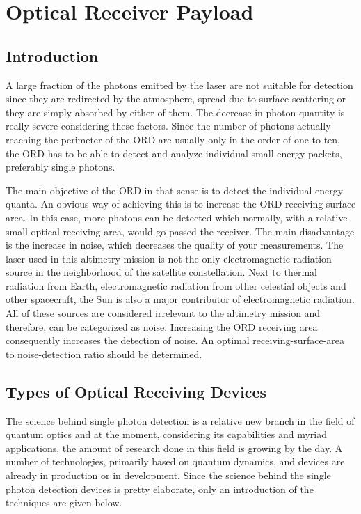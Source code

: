 \section{Optical Receiver Payload}
	\label{blDOreceiver}
		\subsection{Introduction}
A large fraction of the photons emitted by the \acs{laser} are not suitable for detection since they are redirected by the atmosphere, spread due to surface scattering or they are simply absorbed by either of them. The decrease in photon quantity is really severe considering these factors. Since the number of photons actually reaching the perimeter of the \ac{ORD} are usually only in the order of one to ten, the \acs{ORD} has to be able to detect and analyze individual small energy packets, preferably single photons. 

The main objective of the \acs{ORD} in that sense is to detect the individual energy quanta. An obvious way of achieving this is to increase the \acs{ORD} receiving surface area. In this case, more photons can be detected which normally, with a relative small optical receiving area, would go passed the receiver. The main disadvantage is the increase in noise, which decreases the quality of your measurements. The \acs{laser} used in this altimetry mission is not the only electromagnetic radiation source in the neighborhood of the satellite constellation. Next to thermal radiation from Earth, electromagnetic radiation from other celestial objects and other spacecraft, the Sun is also a major contributor of electromagnetic radiation. All of these sources are considered irrelevant to the altimetry mission and therefore, can be categorized as noise. Increasing the \acs{ORD} receiving area consequently increases the detection of noise. An optimal receiving-surface-area to noise-detection ratio should be determined.

\subsection{Types of Optical Receiving Devices}
	\label{blDOtypesORD}
The science behind single photon detection is a relative new branch in the field of quantum optics and at the moment, considering its capabilities and myriad applications, the amount of research done in this field is growing by the day. A number of technologies, primarily based on quantum dynamics, and devices are already in production or in development. Since the science behind the single photon detection devices is pretty elaborate, only an introduction of the techniques are given below.

